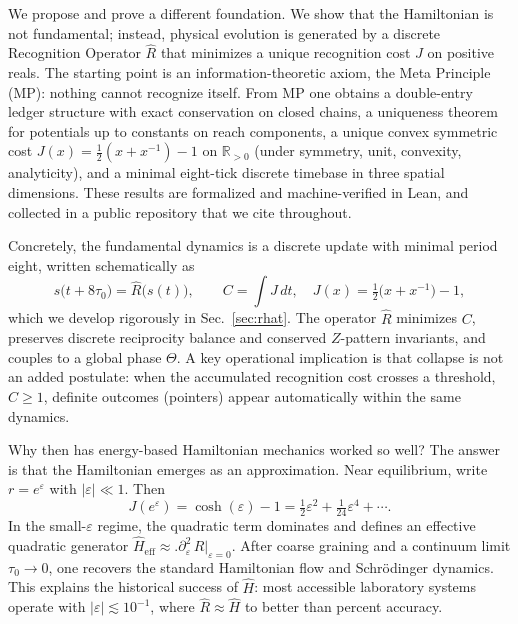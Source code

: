\documentclass[aps,prx,twocolumn,superscriptaddress,nofootinbib]{revtex4-2}
\newcommand{\Rhat}{\hat{R}}
\newcommand{\Hhat}{\hat{H}}
\newcommand{\Jcost}{J}
\newcommand{\Ccost}{C}
\newcommand{\TauZero}{\tau_{0}}
\newcommand{\ThetaPhase}{\Theta}
\begin{document}
We propose and prove a different foundation. We show that the Hamiltonian is not fundamental; instead, physical evolution is generated by a discrete Recognition Operator \(\Rhat\) that minimizes a unique recognition cost \(\Jcost\) on positive reals. The starting point is an information-theoretic axiom, the Meta Principle (MP): nothing cannot recognize itself. From MP one obtains a double-entry ledger structure with exact conservation on closed chains, a uniqueness theorem for potentials up to constants on reach components, a unique convex symmetric cost \(\Jcost(x)=\tfrac12(x+x^{-1})-1\) on \(\mathbb{R}_{>0}\) (under symmetry, unit, convexity, analyticity), and a minimal eight-tick discrete timebase in three spatial dimensions. These results are formalized and machine-verified in Lean, and collected in a public repository that we cite throughout.

Concretely, the fundamental dynamics is a discrete update with minimal period eight, written schematically as
\begin{equation}\label{eq:intro_update}
  s\bigl(t+8\TauZero\bigr) = \Rhat\bigl(s(t)\bigr),\qquad \Ccost=\int \Jcost\,dt,\quad \Jcost(x)=\tfrac12\bigl(x+x^{-1}\bigr)-1,
\end{equation}
which we develop rigorously in Sec.~\ref{sec:rhat}. The operator \(\Rhat\) minimizes \(\Ccost\), preserves discrete reciprocity balance and conserved \(Z\)-pattern invariants, and couples to a global phase \(\ThetaPhase\). A key operational implication is that collapse is not an added postulate: when the accumulated recognition cost crosses a threshold, \(\Ccost\ge 1\), definite outcomes (pointers) appear automatically within the same dynamics.

Why then has energy-based Hamiltonian mechanics worked so well? The answer is that the Hamiltonian emerges as an approximation. Near equilibrium, write \(r=e^{\varepsilon}\) with \(|\varepsilon|\ll 1\). Then
\begin{equation}\label{eq:intro_series}
  \Jcost(e^{\varepsilon})=\cosh(\varepsilon)-1=\tfrac12\varepsilon^2+\tfrac1{24}\varepsilon^4+\cdots.
\end{equation}
In the small-\(\varepsilon\) regime, the quadratic term dominates and defines an effective quadratic generator \(\Hhat_{\!\mathrm{eff}}\approx \bigl.\partial_\varepsilon^2\,\Rhat\bigr|_{\varepsilon=0}\). After coarse graining and a continuum limit \(\TauZero\to 0\), one recovers the standard Hamiltonian flow and Schrödinger dynamics. This explains the historical success of \(\Hhat\): most accessible laboratory systems operate with \(|\varepsilon|\lesssim 10^{-1}\), where \(\Rhat\approx\Hhat\) to better than percent accuracy.
\end{document}
